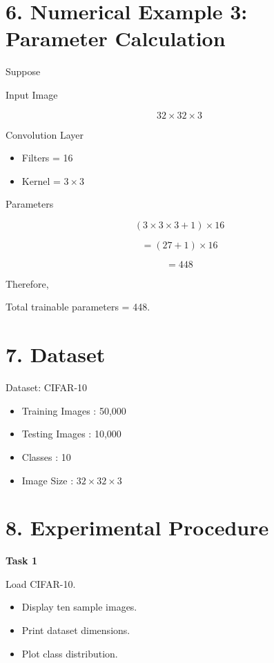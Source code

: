 \documentclass[11pt]{article}
\begin{document}
\section*{6. Numerical Example 3: Parameter Calculation}

Suppose

Input Image

\[
32\times32\times3
\]

Convolution Layer

\begin{itemize}
\item Filters = 16
\item Kernel = $3\times3$
\end{itemize}

Parameters

\[
(3\times3\times3+1)\times16
\]

\[
=(27+1)\times16
\]

\[
=448
\]

Therefore,

Total trainable parameters = 448.

\section*{7. Dataset}

Dataset: CIFAR-10

\begin{itemize}
\item Training Images : 50,000
\item Testing Images : 10,000
\item Classes : 10
\item Image Size : $32\times32\times3$
\end{itemize}

\section*{8. Experimental Procedure}

\textbf{Task 1}

Load CIFAR-10.

\begin{itemize}
\item Display ten sample images.
\item Print dataset dimensions.
\item Plot class distribution.
\end{itemize}

\bigskip
\end{document}
